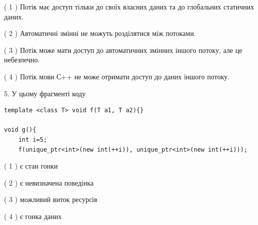 \documentclass[12pt, ukrainian]{article}
\begin{document}
\begin {large}
{( 1 ) Потік має доступ тільки до своїх власних даних та до глобальних статичних даних.%

( 2 ) Автоматичні змінні не можуть розділятися між потоками.%

( 3 ) Потік може мати доступ до автоматичних змінних іншого потоку, але це небезпечно.%

( 4 ) Потік мови С++ не може отримати доступ до даних іншого потоку.%


5. У цьому фрагменті коду
\begin{verbatim}
template <class T> void f(T a1, T a2){}

void g(){
    int i=5;
    f(unique_ptr<int>(new int(++i)), unique_ptr<int>(new int(++i)));
\end{verbatim}

( 1 ) є стан гонки%

( 2 ) є невизначена поведінка%

( 3 ) можливий виток ресурсів%

( 4 ) є гонка даних%
}
\end {large}
\end{document}
